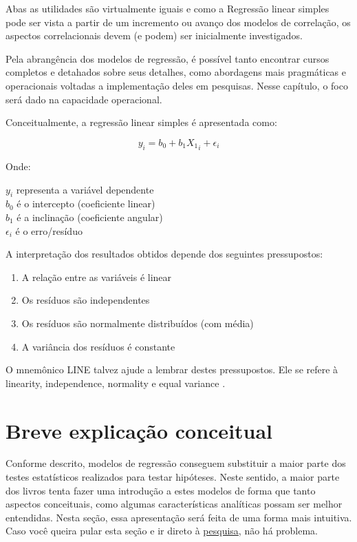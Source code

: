 \documentclass[
]{book}
\providecommand{\tightlist}{%
  \setlength{\itemsep}{0pt}\setlength{\parskip}{0pt}}
\begin{document}
Abas as utilidades são virtualmente iguais e como a Regressão linear simples pode ser vista a partir de um incremento ou avanço dos modelos de correlação, os aspectos correlacionais devem (e podem) ser inicialmente investigados.

Pela abrangência dos modelos de regressão, é possível tanto encontrar cursos completos e detahados sobre seus detalhes, como abordagens mais pragmáticas e operacionais voltadas a implementação deles em pesquisas. Nesse capítulo, o foco será dado na capacidade operacional.

Conceitualmente, a regressão linear simples é apresentada como:

\[y_i = b_0 + b_1X{_1}_i + \epsilon_{i}\]

Onde:

\(y_i\) representa a variável dependente\\
\(b_0\) é o intercepto (coeficiente linear)\\
\(b_1\) é a inclinação (coeficiente angular)\\
\(\epsilon_{i}\) é o erro/resíduo

A interpretação dos resultados obtidos depende dos seguintes pressupostos:

\begin{enumerate}
\def\labelenumi{(\roman{enumi})}
\tightlist
\item
  A relação entre as variáveis é linear
\item
  Os resíduos são independentes\\
\item
  Os resíduos são normalmente distribuídos (com média)\\
\item
  A variância dos resíduos é constante
\end{enumerate}

O mnemônico LINE talvez ajude a lembrar destes pressupostos. Ele se refere à linearity, independence, normality e equal variance .

\hypertarget{breve-explicauxe7uxe3o-conceitual}{%
\section{Breve explicação conceitual}\label{breve-explicauxe7uxe3o-conceitual}}

Conforme descrito, modelos de regressão conseguem substituir a maior parte dos testes estatísticos realizados para testar hipóteses. Neste sentido, a maior parte dos livros tenta fazer uma introdução a estes modelos de forma que tanto aspectos conceituais, como algumas características analíticas possam ser melhor entendidas. Nesta seção, essa apresentação será feita de uma forma mais intuitiva. Caso você queira pular esta seção e ir direto à \protect\hyperlink{ux5cux23pesquisa}{pesquisa}, não há problema.
\end{document}
